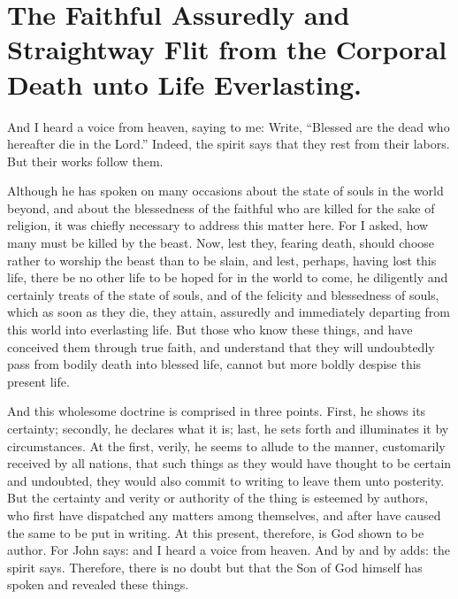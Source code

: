 \chapter[Sermon 65. The Faithful Assuredly and Straightway Flit from the Corporal Death unto Life Everlasting.]{The Faithful Assuredly and Straightway Flit from the Corporal Death unto Life Everlasting.}
\label{sermon:065}

And I heard a voice from heaven, saying to me: Write, “Blessed are the dead who hereafter die in the Lord.” Indeed, the spirit says that they rest from their labors. But their works follow them.

Although he has spoken on many occasions about the state of souls in the world beyond, and about the blessedness of the faithful who are killed for the sake of religion, it was chiefly necessary to address this matter here. For I asked, how many must be killed by the beast. Now, lest they, fearing death, should choose rather to worship the beast than to be slain, and lest, perhaps, having lost this life, there be no other life to be hoped for in the world to come, he diligently and certainly treats of the state of souls, and of the felicity and blessedness of souls, which as soon as they die, they attain, assuredly and immediately departing from this world into everlasting life. But those who know these things, and have conceived them through true faith, and understand that they will undoubtedly pass from bodily death into blessed life, cannot but more boldly despise this present life.

And this wholesome doctrine is comprised in three points. First, he shows its certainty; secondly, he declares what it is; last, he sets forth and illuminates it by circumstances. At the first, verily, he seems to allude to the manner, customarily received by all nations, that such things as they would have thought to be certain and undoubted, they would also commit to writing to leave them unto posterity. But the certainty and verity or authority of the thing is esteemed by authors, who first have dispatched any matters among themselves, and after have caused the same to be put in writing. At this present, therefore, is God shown to be author. For John says: and I heard a voice from heaven. And by and by adds: the spirit says. Therefore, there is no doubt but that the Son of God himself has spoken and revealed these things.

